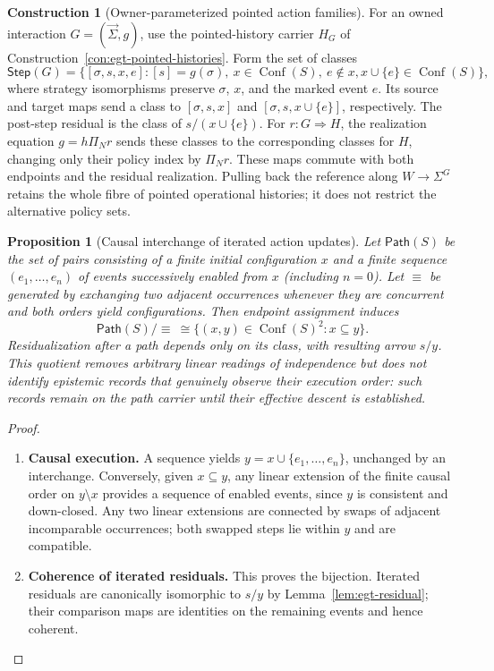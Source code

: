 \documentclass[11pt,a4paper]{article}
\numberwithin{equation}{section}
\newtheorem{proposition}[theorem]{Proposition}
\theoremstyle{definition}
\newtheorem{construction}[construction]{Construction}
\theoremstyle{remark}
\theoremstyle{plain}
\begin{document}
\begin{construction}[Owner-parameterized pointed action families]
\label{con:egt-owned-pointed-actions}
For an owned interaction $G=(\vec\Sigma,g)$, use the pointed-history
carrier $H_G$ of Construction~\ref{con:egt-pointed-histories}. Form the
set of classes
\[
 \mathsf{Step}(G)=
 \{[\sigma,s,x,e]:[s]=g(\sigma),\ 
       x\in\operatorname{Conf}(S),\ e\notin x,
       x\cup\{e\}\in\operatorname{Conf}(S)\},
\]
where strategy isomorphisms preserve $\sigma$, $x$, and the marked event
$e$. Its source and target maps send a class to
$[\sigma,s,x]$ and $[\sigma,s,x\cup\{e\}]$, respectively. The
post-step residual is the class of $s/(x\cup\{e\})$. For
$r:G\Rightarrow H$, the realization equation $g=h\Pi_Nr$ sends these
classes to the corresponding classes for $H$, changing only their policy
index by $\Pi_Nr$. These maps commute with both endpoints and the
residual realization. Pulling back the reference along
$W\to\Sigma^G$ retains the whole fibre of pointed operational
histories; it does not restrict the alternative policy sets.
\end{construction}

\begin{proposition}[Causal interchange of iterated action updates]
\label{prop:egt-operational-action-interchange}
Let $\mathsf{Path}(S)$ be the set of pairs consisting of a finite initial
configuration $x$ and a finite sequence $(e_1,\ldots,e_n)$ of events
successively enabled from $x$ (including $n=0$). Let $\equiv$ be
generated by
exchanging two adjacent occurrences whenever they are concurrent and
both orders yield configurations. Then endpoint assignment induces
\begin{equation}\label{eq:egt-action-trace-quotient}
 \mathsf{Path}(S)/{\equiv}
 \ \cong
 \{(x,y)\in\operatorname{Conf}(S)^2:x\subseteq y\}.
\end{equation}
Residualization after a path depends only on its class, with resulting
arrow $s/y$. This quotient removes arbitrary linear readings of
independence but does not identify epistemic records that genuinely
observe their execution order: such records remain on the path carrier
until their effective descent is established.
\end{proposition}
\begin{proof}
\leavevmode
\begin{enumerate}[label=\textup{(\arabic*)},leftmargin=*,itemsep=4pt,topsep=3pt]
  \item \textbf{Causal execution.} A sequence yields $y=x\cup\{e_1,\ldots,e_n\}$, unchanged by an
interchange. Conversely, given $x\subseteq y$, any linear extension
of the finite causal order on $y\setminus x$ provides a sequence of
enabled events, since $y$ is consistent and down-closed. Any two
linear extensions are connected by swaps of adjacent incomparable
occurrences; both swapped steps lie within $y$ and are compatible.
  \item \textbf{Coherence of iterated residuals.} This proves the bijection. Iterated residuals are canonically
isomorphic to $s/y$ by Lemma~\ref{lem:egt-residual}; their comparison
maps are identities on the remaining events and hence coherent.
\end{enumerate}
\end{proof}
\end{document}
